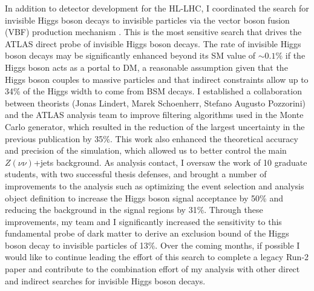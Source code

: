 \documentclass[a4paper]{article}
\begin{document}
In addition to detector development for the HL-LHC, I coordinated the search for invisible Higgs boson decays to invisible particles via the vector boson fusion (VBF) production mechanism  \cite{vbfMET_CONF2020}. This is the most sensitive search that drives the ATLAS direct probe of invisible Higgs boson decays. The rate of invisible Higgs boson decays may be significantly enhanced beyond its SM value of $\sim0.1\%$ if the Higgs boson acts as a portal to DM, a reasonable assumption given that the Higgs boson couples to massive particles and that indirect constraints allow up to 34\% of the Higgs width to come from BSM decays. I established a collaboration between theorists (Jonas Lindert, Marek Schoenherr, Stefano Augusto Pozzorini) and the ATLAS analysis team to improve filtering algorithms used in the Monte Carlo generator, which resulted in the reduction of the largest uncertainty in the previous publication by 35\%. This work also enhanced the theoretical accuracy and precision of the simulation, which allowed us to better control the main $Z\left(\nu\nu\right)$+jets background. As analysis contact, I oversaw the work of 10 graduate students, with two successful thesis defenses, and brought a number of improvements to the analysis such as optimizing the event selection and analysis object definition to increase the Higgs boson signal acceptance by 50\% and reducing the background in the signal regions by 31\%. Through these improvements, my team and I significantly increased the sensitivity to this fundamental probe of dark matter to derive an exclusion bound of the Higgs boson decay to invisible particles of 13\%. Over the coming months, if possible I would like to continue leading the effort of this search to complete a legacy Run-2 paper and contribute to the combination effort of my analysis with other direct and indirect searches for invisible Higgs boson decays.

\bigskip
\end{document}
